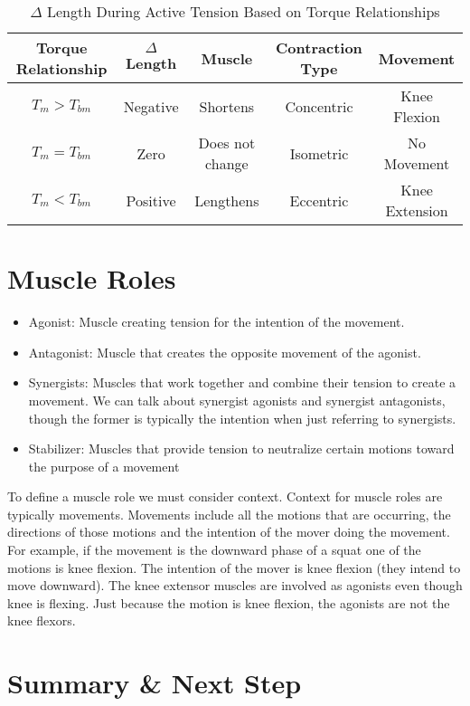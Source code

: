\begin{table}[h!]
\centering
\begin{tabular}{||c c c c c||} 
 \hline
 Torque Relationship & $\Delta$ Length & Muscle & Contraction Type & Movement\\ [0.5ex] 
 \hline\hline
$T_m > T_{bm}$ & Negative & Shortens & Concentric & Knee Flexion \\
$T_m = T_{bm}$ & Zero & Does not change & Isometric & No Movement\\[1ex] 
$T_m < T_{bm}$ & Positive & Lengthens & Eccentric & Knee Extension \\[1ex] 
 \hline
\end{tabular}
\caption{$\Delta$ Length During Active Tension Based on Torque Relationships}
\label{table:NHE}
\end{table}

\section{Muscle Roles}

\begin{itemize}
\item Agonist: Muscle creating tension for the intention of the movement.
\item Antagonist: Muscle that creates the opposite movement of the agonist.
\item Synergists: Muscles that work together and combine their tension to create a movement. We can talk about synergist agonists and synergist antagonists, though the former is typically the intention when just referring to synergists.
\item Stabilizer: Muscles that provide tension to neutralize certain motions toward the purpose of a movement
\end{itemize}

To define a muscle role we must consider context. Context for muscle roles are typically movements. Movements include all the motions that are occurring, the directions of those motions and the intention of the mover doing the movement. For example, if the movement is the downward phase of a squat one of the motions is knee flexion. The intention of the mover is knee flexion (they intend to move downward). The knee extensor muscles are involved as agonists even though knee is flexing. Just because the motion is knee flexion, the agonists are not the knee flexors.



\section{Summary \& Next Step}

